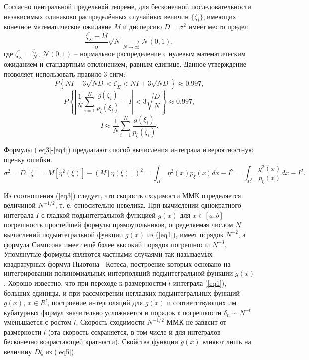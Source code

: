 \documentclass[
11pt,
master, %
subf, %
href, %
colorlinks=true, %
times, %
]{disser}
\begin{document}
Согласно центральной предельной теореме, для бесконечной последовательности независимых одинаково распределённых случайных величин $\{\zeta_i\}$, имеющих конечное математическое ожидание $M$ и дисперсию $D = \sigma^2$ имеет место предел
$$\frac{\overline{\zeta_\Sigma}-M}{\sigma}\sqrt{N} \underset{N\rightarrow \infty}\rightarrow\mathcal{N}(0,1),$$
где $\overline{\zeta_\Sigma} = \frac{\zeta_\Sigma}{N}$, $\mathcal{N}(0,1)$ -- нормальное распределение с нулевым математическим ожиданием и стандартным отклонением, равным единице. Данное утверждение позволяет использовать правило 3-сигм:
$$P\left\{NI-3\sqrt{ND} < \zeta_\Sigma < NI + 3\sqrt{ND}\right\} \approx 0.997,$$
\begin{equation}\label{eq3}
  P\left\{\left|\frac{1}{N}\sum_{i=1}^{N}\frac{g(\xi_i)}{p_{\xi}(\xi_i)}-I\right| < 3\sqrt{\frac{D}{N}}\right\} \approx 0.997,
\end{equation}
\begin{equation}\label{eq4}
  I \approx \frac{1}{N}\sum_{i=1}^{N}\frac{g(\xi_i)}{p_{\xi}(\xi_i)}.
\end{equation}

Формулы (\ref{eq3}-\ref{eq4}) предлагают способ вычисления интеграла и вероятностную оценку ошибки.
\begin{equation}\label{eq5}
  \sigma^2 = D[\zeta] = M[\eta^2(\xi)] - (M[\eta(\xi)])^2 = \int_{R^l} \eta^2(x) p_{\xi}(x)dx - I^2 = \int_{R^l}\frac{g^2(x)}{p_{\xi}(x)}dx - I^2.
\end{equation}

Из соотношения (\ref{eq3}) следует, что скорость сходимости ММК определяется величиной $N^{-1/2}$, т. е. относительно невелика. При вычислении однократного интеграла $I$ с гладкой подынтегральной функцией $g(x)$ для $x \in [a, b]$ погрешность простейшей формулы прямоугольников, определяемая числом $N$ вычислений подынтегральной функции $g(x)$ из (\ref{eq1}), имеет порядок $N^{-2}$, а формула Симпсона имеет ещё более высокий порядок погрешности $N^{-3}$. Упомянутые формулы являются частными случаями так называемых квадратурных формул Ньютона—Котеса, построение которых основано на интегрировании полиномиальных интерполяций подынтегральной функции $g(x)$. Хорошо известно, что при переходе к размерностям $l$ интеграла (\ref{eq1}), больших единицы, и при рассмотрении негладких подынтегральных функций $g(x)$, $x \in R^l$, построение интерполяций для $g(x)$ и соответствующих им кубатурных формул значительно усложняется и порядок $t$ погрешности $\delta_n \sim N^{-t}$ уменьшается с ростом $l$. Скорость сходимости $N^{-1/2}$ ММК не зависит от размерности $l$ (эта скорость сохраняется, в том числе и для интегралов бесконечно возрастающей кратности). Свойства функции $g(x)$ влияют лишь на величину $D\zeta$ из (\ref{eq5}).
\end{document}
